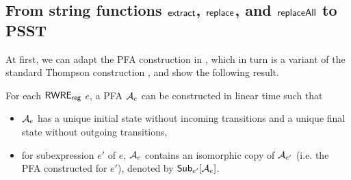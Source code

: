 \subsection{From string functions $\mathsf{extract}$, $\mathsf{replace}$, and $\mathsf{replaceAll}$ to PSST}\label{appendix:sec-extract-replace-to-psst}

At first, we can adapt the PFA construction in \cite{BDM14}, which in turn is a variant of the standard Thompson construction \cite{Thompson68}, and show the following result. 

\begin{proposition}\label{prop-rwre-to-pfa}
	For each ${\sf RWRE_{reg}}$ $e$, a PFA $\mathcal{A}_e$ can be constructed in linear time such that 
	\begin{itemize}
		\item $\mathcal{A}_e$ has a unique initial state without incoming transitions and a unique final state without outgoing transitions,
		\item for subexpression $e'$ of $e$, $\mathcal{A}_e$ contains an isomorphic copy of $\mathcal{A}_{e'}$ (i.e. the PFA constructed for $e'$), denoted by ${\sf Sub}_{e'}[\mathcal{A}_e]$. 
	\end{itemize}
\end{proposition}

